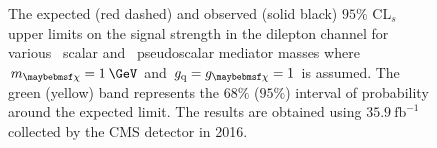 \begin{figure}
  \centering
  \hspace{1 cm}
  \caption{The expected (red dashed) and observed (solid black) $95\%$ $\textrm{CL}_{s}$ upper limits on the \ttDM signal strength in the dilepton channel for various~\protect{} scalar and~\protect{} pseudoscalar mediator masses where $\mDM=1\:\GeV$ and $\gq = \gDM = 1$ is assumed. The green (yellow) band represents the $68\%$ ($95\%$) interval of probability around the expected limit. The results are obtained using $35.9\:\textrm{fb}^{-1}$ collected by the CMS detector in 2016.}
\end{figure}

\clearpage

